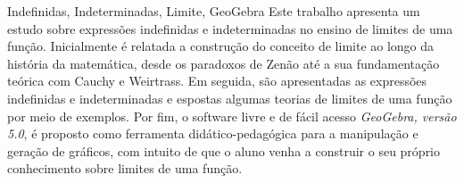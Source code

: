 \begin{resumo}{Indefinidas, Indeterminadas, Limite, GeoGebra}
\label{sec:resumo}
Este trabalho apresenta um estudo sobre expressões indefinidas e indeterminadas no ensino de limites de uma função. Inicialmente é relatada a construção do conceito de limite ao longo da história da matemática, desde os paradoxos de  Zenão até a sua fundamentação teórica com Cauchy e Weirtrass. Em seguida, são apresentadas as expressões indefinidas e indeterminadas e espostas algumas  teorias de limites de uma função por meio de exemplos. Por fim, o software livre e de fácil acesso  \textit{GeoGebra, versão 5.0}, é proposto como ferramenta didático-pedagógica para a manipulação e geração  de gráficos, com intuito  de que o aluno  venha a construir o seu próprio conhecimento sobre limites de uma função.
\end{resumo}
\begin{abstract}{key words}
\label{sec:abstract}
text
\end{abstract}